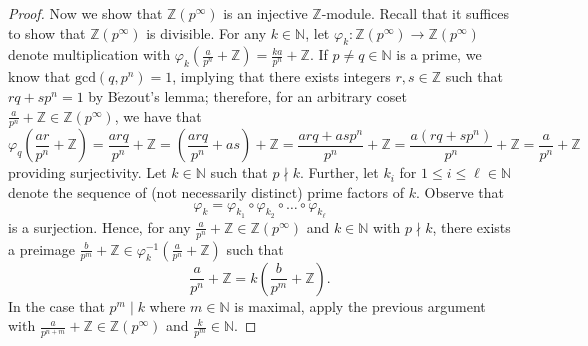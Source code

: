 \documentclass[ 12pt ]{article}
\begin{document}
\begin{enumerate}
\begin{proof}
			Now we show that $\mathbb{Z}(p^\infty)$ is an injective $\mathbb{Z}$-module. Recall that it suffices to show that $\mathbb{Z}(p^\infty)$ is divisible. For any $k \in \mathbb{N}$, let $\varphi_k : \mathbb{Z}(p^\infty) \to \mathbb{Z}(p^\infty)$ denote multiplication with $\varphi_k \left ( \frac{a}{p^n} + \mathbb{Z} \right ) = \frac{ka}{p^n} + \mathbb{Z}$. If $p \neq q \in \mathbb{N}$ is a prime, we know that $\mathrm{gcd}(q, p^n) = 1$, implying that there exists integers $r, s \in \mathbb{Z}$ such that $rq + sp^n = 1$ by B$\acute{\mathrm{e}}$zout's lemma; therefore, for an arbitrary coset $\frac{a}{p^n} + \mathbb{Z} \in \mathbb{Z}(p^\infty)$, we have that $$\varphi_q \left ( \frac{ar}{p^n} + \mathbb{Z} \right ) = \frac{arq}{p^n} + \mathbb{Z} = \left ( \frac{arq}{p^n} + as \right ) + \mathbb{Z} = \frac{arq + asp^n}{p^n} + \mathbb{Z} = \frac{a(rq + sp^n)}{p^n} + \mathbb{Z} = \frac{a}{p^n} + \mathbb{Z}$$ providing surjectivity. Let $k \in \mathbb{N}$ such that $p \nmid k$. Further, let $k_i$ for $1 \leq i \leq \ell \in \mathbb{N}$ denote the sequence of (not necessarily distinct) prime factors of $k$. Observe that $$\varphi_k = \varphi_{k_1} \circ \varphi_{k_2} \circ \hdots \circ \varphi_{k_\ell}$$ is a surjection. Hence, for any $\frac{a}{p^n} + \mathbb{Z} \in \mathbb{Z}(p^\infty)$ and $k \in \mathbb{N}$ with $p \nmid k$, there exists a preimage $\frac{b}{p^m} + \mathbb{Z} \in \varphi_k^{-1} \left ( \frac{a}{p^n} + \mathbb{Z} \right )$ such that $$\frac{a}{p^n} + \mathbb{Z} = k \left ( \frac{b}{p^m} + \mathbb{Z} \right ).$$ In the case that $p^m \mid k$ where $m \in \mathbb{N}$ is maximal, apply the previous argument with $\frac{a}{p^{n+m}} + \mathbb{Z} \in \mathbb{Z}(p^\infty)$ and $\frac{k}{p^m} \in \mathbb{N}$.
		\end{proof}



\end{enumerate}
\end{document}
